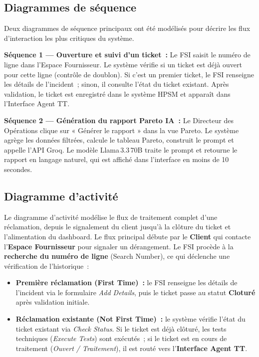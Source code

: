 \documentclass[10pt,a4paper]{report}
\begin{document}
\subsection{Diagrammes de séquence}

Deux diagrammes de séquence principaux ont été modélisés pour décrire les flux d'interaction les plus critiques du système.

\textbf{Séquence 1 --- Ouverture et suivi d'un ticket~:} Le FSI saisit le numéro de ligne dans l'Espace Fournisseur. Le système vérifie si un ticket est déjà ouvert pour cette ligne (contrôle de doublon). Si c'est un premier ticket, le FSI renseigne les détails de l'incident~; sinon, il consulte l'état du ticket existant. Après validation, le ticket est enregistré dans le système HPSM et apparaît dans l'Interface Agent TT.

\textbf{Séquence 2 --- Génération du rapport Pareto IA~:} Le Directeur des Opérations clique sur « Générer le rapport » dans la vue Pareto. Le système agrège les données filtrées, calcule le tableau Pareto, construit le prompt et appelle l'API Groq. Le modèle Llama\,3.3\,70B traite le prompt et retourne le rapport en langage naturel, qui est affiché dans l'interface en moins de 10\,secondes.

\subsection{Diagramme d'activité}

Le diagramme d'activité modélise le flux de traitement complet d'une réclamation, depuis le signalement du client jusqu'à la clôture du ticket et l'alimentation du dashboard. Le flux principal débute par le \textbf{Client} qui contacte l'\textbf{Espace Fournisseur} pour signaler un dérangement. Le FSI procède à la \textbf{recherche du numéro de ligne} (Search Number), ce qui déclenche une vérification de l'historique~:

\begin{itemize}[leftmargin=*, itemsep=4pt]
  \item \textbf{Première réclamation (First Time)~:} le FSI renseigne les détails de l'incident via le formulaire \textit{Add Details}, puis le ticket passe au statut \textbf{Cloturé} après validation initiale.
  \item \textbf{Réclamation existante (Not First Time)~:} le système vérifie l'état du ticket existant via \textit{Check Status}. Si le ticket est déjà clôturé, les tests techniques (\textit{Execute Tests}) sont exécutés~; si le ticket est en cours de traitement (\textit{Ouvert / Traitement}), il est routé vers l'\textbf{Interface Agent TT}.
\end{itemize}
\end{document}
